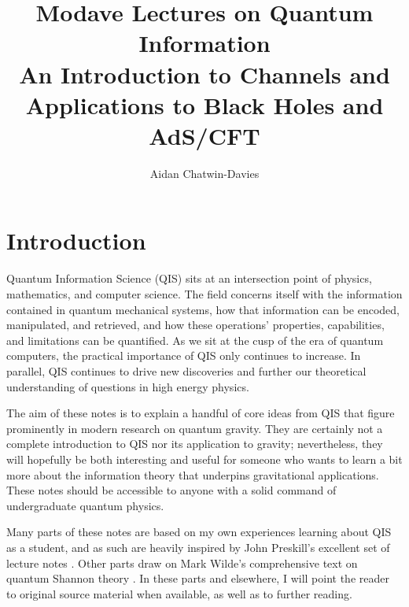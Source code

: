 \documentclass[a4paper,11pt]{article}
\title{Modave Lectures on Quantum Information\\{\normalsize An Introduction to Channels and Applications to Black Holes and AdS/CFT}}
\author*{Aidan Chatwin-Davies}
\affiliation{KU Leuven, Institute for Theoretical Physics\\
 Celestijnenlaan 200D, B-3001 Leuven, Belgium}
\begin{document}
\maketitle


\section{Introduction}

Quantum Information Science (QIS) sits at an intersection point of physics, mathematics, and computer science.
The field concerns itself with the information contained in quantum mechanical systems, how that information can be encoded, manipulated, and retrieved, and how these operations' properties, capabilities, and limitations can be quantified.
As we sit at the cusp of the era of quantum computers, the practical importance of QIS only continues to increase.
In parallel, QIS continues to drive new discoveries and further our theoretical understanding of questions in high energy physics.

The aim of these notes is to explain a handful of core ideas from QIS that figure prominently in modern research on quantum gravity.
They are certainly not a complete introduction to QIS nor its application to gravity; nevertheless, they will hopefully be both interesting and useful for someone who wants to learn a bit more about the information theory that underpins gravitational applications.
These notes should be accessible to anyone with a solid command of undergraduate quantum physics.

Many parts of these notes are based on my own experiences learning about QIS as a student, and as such are heavily inspired by John Preskill's excellent set of lecture notes \cite{preskill}.
Other parts draw on Mark Wilde's comprehensive text on quantum Shannon theory \cite{Wilde:2011npi}.
In these parts and elsewhere, I will point the reader to original source material when available, as well as to further reading.
\end{document}
